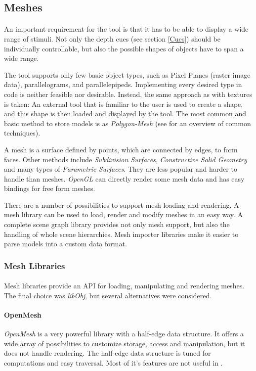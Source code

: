 \subsection{Meshes\label{Meshes}}
\paragraph{}
An important requirement for the tool is that it has to be able to display a wide range of stimuli.
Not only the depth cues (see section \ref{Cues}) should be individually controllable, but also the possible shapes of objects have to span a wide range.

The tool supports only few basic object types, such as Pixel Planes (raster image data), parallelograms, and parallelepipeds. Implementing every desired type in code is neither feasible nor desirable.
Instead, the same approach as with textures is taken: An external tool that is familiar to the user is used to create a shape, and this shape is then loaded and displayed by the tool.
The most common and basic method to store models is as \textit{Polygon-Mesh} (see \cite{MeshPop} for an overview of common techniques).

A mesh is a surface defined by points, which are connected by edges, to form faces. Other methods include \textit{Subdivision Surfaces}, \textit{Constructive Solid Geometry} and many types of \textit{Parametric Surfaces}.
They are less popular and harder to handle than meshes.
\textit{OpenGL} can directly render some mesh data and has easy bindings for free form meshes.

There are a number of possibilities to support mesh loading and rendering.
A mesh library can be used to load, render and modify meshes in an easy way.
A complete scene graph library provides not only mesh support, but also the handling of whole scene hierarchies.
Mesh importer libraries make it easier to parse models into a custom data format.


\subsubsection{Mesh Libraries}
\paragraph{}
Mesh libraries provide an API for loading, manipulating and rendering meshes.
The final choice was \textit{libObj}, but several alternatives were considered.

\paragraph{OpenMesh}
\textit{OpenMesh} is a very powerful library with a half-edge data structure.
It offers a wide array of possibilities to customize storage, access and manipulation,
but it does not handle rendering.
The half-edge data structure is tuned for computations and easy traversal.
Most of it's features are not useful in \ER.

